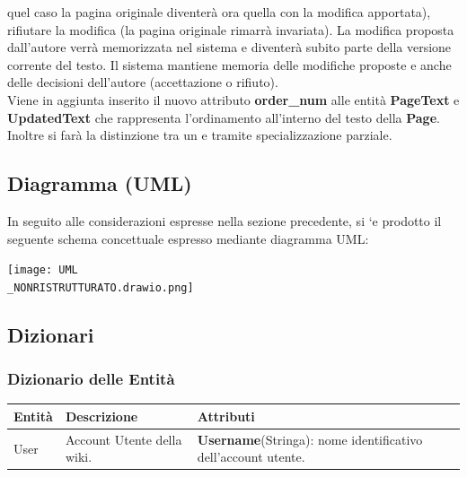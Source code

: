 \documentclass{article}
\begin{document}
{{		quel caso la pagina originale diventerà ora quella con la modifica apportata), rifiutare la modifica (la pagina
		originale rimarrà invariata). La modifica proposta dall’autore verrà memorizzata nel sistema e diventerà
		subito parte della versione corrente del testo. Il sistema mantiene memoria delle modifiche proposte e anche
		delle decisioni dell’autore (accettazione o rifiuto).}
	\vspace{0.5cm}
	\\
	Viene in aggiunta inserito il nuovo attributo \textbf{order\_num} alle entità {\textbf {PageText}} e {\textbf {UpdatedText}} che rappresenta l'ordinamento all'interno del testo della {\textbf {Page}}. Inoltre si far\`a la distinzione tra un  e  tramite specializzazione parziale.
	
	\newpage
	
	{\subsection{Diagramma (UML)}}
	 In seguito alle considerazioni espresse nella sezione precedente, si `e prodotto
	 il seguente schema concettuale espresso mediante diagramma UML:
	 
	\begin{center}
	\texttt{[image: UML\\\_NONRISTRUTTURATO.drawio.png]}
	\end{center}
	 
	 
	{\subsection{Dizionari}}
	{\subsubsection{Dizionario delle Entità}}
	
	\begin{table}[H]
		\centering
		\small %
		\setlength{\tabcolsep}{6pt} %
		\renewcommand{\arraystretch}{1.2} %
		
		\begin{tabularx}{\textwidth}{|l|X|X|}
			\hline
			\textbf{Entità} & \textbf{Descrizione} & \textbf{Attributi} \\
			\hline
			User & Account Utente della wiki. & 
			\textbf{Username}(Stringa): nome identificativo dell'account utente.
			

\end{tabularx}
\end{table}}
\end{document}
